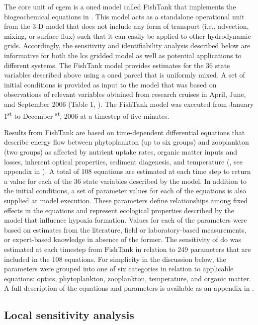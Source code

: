 \documentclass[letterpaper,12pt,oneside]{article}\usepackage[]{graphicx}\usepackage[]{color}
\begin{document}
The core unit of \ac{cgem} is a \ac{oned} model called FishTank that implements the biogeochemical equations in \citet{Eldridge10}.  This model acts as a standalone operational unit from the 3-D model that does not include any form of transport (i.e., advection, mixing, or surface flux) such that it can easily be applied to other hydrodynamic grids.  Accordingly, the sensitivity and identifiability analysis described below are informative for both the \ac{lcs} gridded model as well as potential applications to different systems.  The FishTank model provides estimates for the 36 state variables described above using a \ac{oned} parcel that is uniformly mixed.  A set of initial conditions is provided as input to the model that was based on observations of relevant variables obtained from research cruises in April, June, and September 2006 (Table 1, \citet{Murrell14}).  The FishTank model was executed from January 1\textsuperscript{st} to December \textsuperscript{st}, 2006 at a timestep of five minutes.  

Results from FishTank are based on time-dependent differential equations that describe energy flow between phytoplankton (up to six groups) and zooplankton (two groups) as affected by nutrient uptake rates, organic matter inputs and losses, inherent optical properties, sediment diagenesis, and temperature (\citealt{Penta08,Eldridge10}, see appendix in ).  A total of 108 equations are estimated at each time step to return a value for each of the 36 state variables described by the model.  In addition to the initial conditions, a set of parameter values for each of the equations is also supplied at model execution.  These parameters define relationships among fixed effects in the equations and represent ecological properties described by the model that influence hypoxia formation.  Values for each of the parameters were based on estimates from the literature, field or laboratory-based measurements, or expert-based knowledge in absence of the former.  The sensitivity of \ac{do} was estimated at each timestep from FishTank in relation to 249 parameters that are included in the 108 equations.  For simplicity in the discussion below, the parameters were grouped into one of six categories in relation to applicable equations: optics, phytoplankton, zooplankton, temperature, and organic matter.  A full description of the equations and parameters is available as an appendix in .  
\subsection{Local sensitivity analysis}
\end{document}
